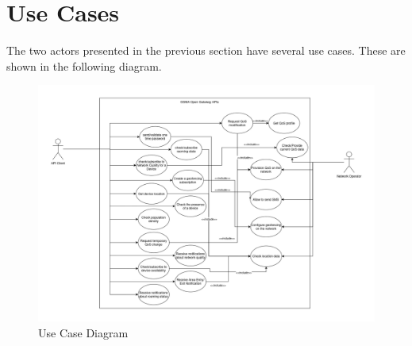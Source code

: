 \section{Use Cases}

The two actors presented in the previous section have several use cases. These
are shown in the following diagram.

\begin{figure}[H]
  \centerline{
    \includegraphics[width=20cm]{figs/use_case_diagram.png}
  }
  \caption{Use Case Diagram}
\end{figure}

